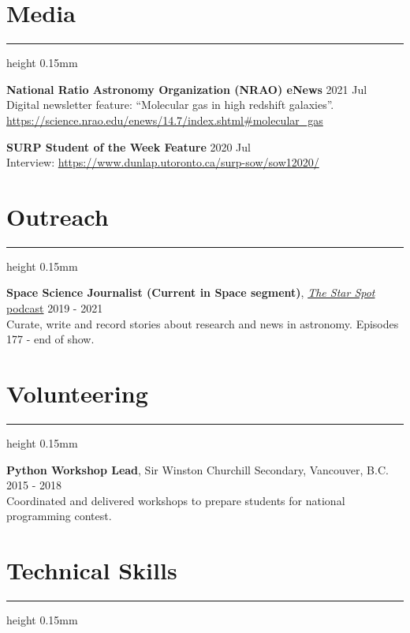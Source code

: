 \documentclass[11pt]{extarticle}
\newcommand{\hrulesp}[1]{%
  \vspace{-1.5mm}
  \hrule height 0.15mm
  \vspace{#1}
}
\begin{document}
\vspace{-7mm}
\section*{Media}
\hrulesp{2mm}

\textbf{National Ratio Astronomy Organization (NRAO) eNews} \hfill 2021 Jul \\
Digital newsletter feature: ``Molecular gas in high redshift galaxies''. \url{https://science.nrao.edu/enews/14.7/index.shtml#molecular_gas}

\textbf{SURP Student of the Week Feature} \hfill 2020 Jul \\
Interview: \url{https://www.dunlap.utoronto.ca/surp-sow/sow12020/}

\vspace{-4mm}
\section*{Outreach}
\hrulesp{2mm}

\textbf{Space Science Journalist (Current in Space segment)}, \href{https://thestarspot.ca/}{\textit{The Star Spot} podcast} \hfill 2019 - 2021 \\
Curate, write and record stories about research and news in astronomy. Episodes 177 - end of show.

\vspace{-4mm}
\section*{Volunteering}
\hrulesp{2mm}

\textbf{Python Workshop Lead}, Sir Winston Churchill Secondary, Vancouver, B.C. \hfill 2015 - 2018 \\
Coordinated and delivered workshops to prepare students for national programming contest.

\vspace{-4mm}
\section*{Technical Skills}
\hrulesp{2mm}
\end{document}
